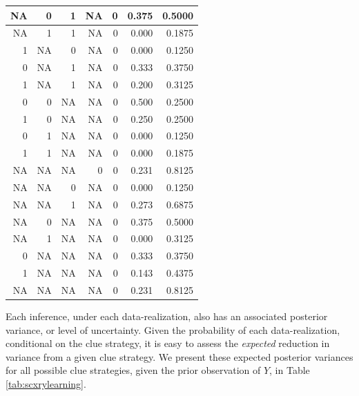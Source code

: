 \documentclass[12pt,]{book}
\begin{document}
\begin{table}[t]
\begin{tabular}{r|r|r|r|r|r|r}
\hline
NA & 0 & 1 & NA & 0 & 0.375 & 0.5000\\
\hline
NA & 1 & 1 & NA & 0 & 0.000 & 0.1875\\
\hline
1 & NA & 0 & NA & 0 & 0.000 & 0.1250\\
\hline
0 & NA & 1 & NA & 0 & 0.333 & 0.3750\\
\hline
1 & NA & 1 & NA & 0 & 0.200 & 0.3125\\
\hline
0 & 0 & NA & NA & 0 & 0.500 & 0.2500\\
\hline
1 & 0 & NA & NA & 0 & 0.250 & 0.2500\\
\hline
0 & 1 & NA & NA & 0 & 0.000 & 0.1250\\
\hline
1 & 1 & NA & NA & 0 & 0.000 & 0.1875\\
\hline
NA & NA & NA & 0 & 0 & 0.231 & 0.8125\\
\hline
NA & NA & 0 & NA & 0 & 0.000 & 0.1250\\
\hline
NA & NA & 1 & NA & 0 & 0.273 & 0.6875\\
\hline
NA & 0 & NA & NA & 0 & 0.375 & 0.5000\\
\hline
NA & 1 & NA & NA & 0 & 0.000 & 0.3125\\
\hline
0 & NA & NA & NA & 0 & 0.333 & 0.3750\\
\hline
1 & NA & NA & NA & 0 & 0.143 & 0.4375\\
\hline
NA & NA & NA & NA & 0 & 0.231 & 0.8125\\
\hline
\end{tabular}
\end{table}

Each inference, under each data-realization, also has an associated posterior variance, or level of uncertainty. Given the probability of each data-realization, conditional on the clue strategy, it is easy to assess the \emph{expected} reduction in variance from a given clue strategy. We present these expected posterior variances for all possible clue strategies, given the prior observation of \(Y\), in Table \ref{tab:scxrylearning}.
\end{document}
